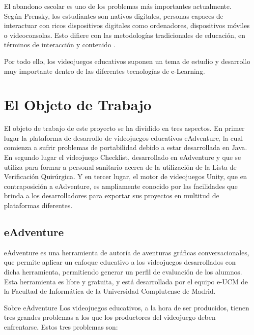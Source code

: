 El abandono escolar es uno de los problemas más importantes actualmente. Según Prensky, los estudiantes son nativos digitales, personas capaces de interactuar con ricos dispositivos digitales como ordenadores, dispositivos móviles o videoconsolas. Esto difiere con las metodologías tradicionales de educación, en términos de interacción y contenido \cite{Torrente2010}.

Por todo ello, los videojuegos educativos suponen un tema de estudio y desarrollo muy importante dentro de las diferentes tecnologías de e-Learning.


\section{El Objeto de Trabajo}
\label{objetodetrabajo}

El objeto de trabajo de este proyecto se ha dividido en tres aspectos. En primer lugar la plataforma de desarrollo de videojuegos educativos eAdventure, la cual comienza a sufrir problemas de portabilidad debido a estar desarrollada en Java. En segundo lugar el videojuego Checklist, desarrollado en eAdventure y que se utiliza para formar a personal sanitario acerca de la utilización de la Lista de Verificación Quirúrgica. Y en tercer lugar, el motor de videojuegos Unity, que en contraposición a eAdventure, es ampliamente conocido por las facilidades que brinda a los desarrolladores para exportar sus proyectos en multitud de plataformas diferentes.

\subsection{eAdventure}
\label{eadventure}

eAdventure es una herramienta de autoría de aventuras gráficas conversacionales, que permite aplicar un enfoque educativo a los videojuegos desarrollados con dicha herramienta, permitiendo generar un perfil de evaluación de los alumnos. Esta herramienta es libre y gratuita, y está desarrollada por el equipo e-UCM de la Facultad de Informática de la Universidad Complutense de Madrid.

Sobre eAdventure Los videojuegos educativos, a la hora de ser producidos, tienen tres grandes problemas a los que los productores del videojuego deben enfrentarse. Estos tres problemas son: 

